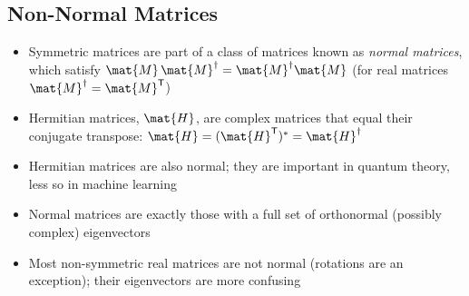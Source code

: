 \Outline %

\begin{slide}
\section[-2]{Non-Normal Matrices}

\begin{PauseHighLight}
  \begin{itemize}\squeeze
  \item Symmetric matrices are part of a class of matrices known as
    \emph{normal matrices}, which satisfy $\mat{M}\,\mat{M}^\dagger =
    \mat{M}^\dagger\mat{M}$\pause{} (for real matrices
    $\mat{M}^\dagger = \mat{M}^\tr$)\pauseb
  \item Hermitian matrices, $\mat{H}$, are complex matrices that equal
    their conjugate transpose: $\mat{H} = (\mat{H}^\tr)^*
    =\mat{H}^\dagger$\pause
  \item Hermitian matrices are also normal; they are important in
    quantum theory, less so in machine learning\pause
  \item Normal matrices are exactly those with a full set of orthonormal
    (possibly complex) eigenvectors\pause
  \item Most non-symmetric real matrices are not normal (rotations are
    an exception); their eigenvectors are more confusing\pause
  \end{itemize}
\end{PauseHighLight}

\end{slide}


